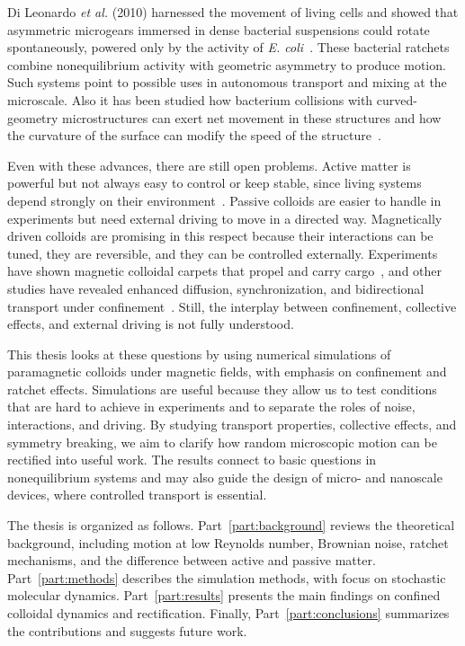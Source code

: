 Di Leonardo \textit{et al.} (2010) harnessed the movement of living cells and showed that asymmetric microgears immersed in dense bacterial suspensions could rotate spontaneously, powered only by the activity of \textit{E. coli}~\cite{di2010bacterial}. These bacterial ratchets combine nonequilibrium activity with geometric asymmetry to produce motion. Such systems point to possible uses in autonomous transport and mixing at the microscale. Also it has been studied how bacterium collisions with curved-geometry microstructures can exert net movement in these structures and how the curvature of the surface can modify the speed of the structure~\cite{pellicciotta2025wall}.

Even with these advances, there are still open problems. Active matter is powerful but not always easy to control or keep stable, since living systems depend strongly on their environment~\cite{bechinger2016active}. Passive colloids are easier to handle in experiments but need external driving to move in a directed way. Magnetically driven colloids are promising in this respect because their interactions can be tuned, they are reversible, and they can be controlled externally. Experiments have shown magnetic colloidal carpets that propel and carry cargo~\cite{martinez2015magnetic}, and other studies have revealed enhanced diffusion, synchronization, and bidirectional transport under confinement~\cite{tierno2012depinning, straube2014tunable, ostinato2024magnetically}. Still, the interplay between confinement, collective effects, and external driving is not fully understood.

This thesis looks at these questions by using numerical simulations of paramagnetic colloids under magnetic fields, with emphasis on confinement and ratchet effects. Simulations are useful because they allow us to test conditions that are hard to achieve in experiments and to separate the roles of noise, interactions, and driving. By studying transport properties, collective effects, and symmetry breaking, we aim to clarify how random microscopic motion can be rectified into useful work. The results connect to basic questions in nonequilibrium systems and may also guide the design of micro- and nanoscale devices, where controlled transport is essential.

The thesis is organized as follows. Part~\ref{part:background} reviews the theoretical background, including motion at low Reynolds number, Brownian noise, ratchet mechanisms, and the difference between active and passive matter. Part~\ref{part:methods} describes the simulation methods, with focus on stochastic molecular dynamics. Part~\ref{part:results} presents the main findings on confined colloidal dynamics and rectification. Finally, Part~\ref{part:conclusions} summarizes the contributions and suggests future work.
